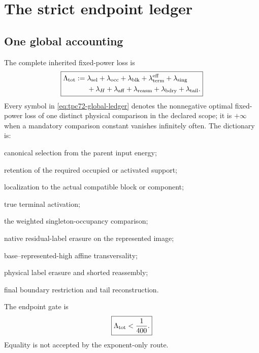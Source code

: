 \section{The strict endpoint ledger}
\label{sec:endpoint-ledger}

\subsection{One global accounting}

The complete inherited fixed-power loss is
\begin{equation}
 \boxed{
 \begin{aligned}
 \Lambda_{\rm tot}:={}&
 \lambda_{\rm sel}
 +\lambda_{\rm occ}
 +\lambda_{\rm blk}
 +\lambda_{\rm term}^{\rm eff}
 +\lambda_{\rm sing}\\
 &+\lambda_H+\lambda_{\rm aff}
 +\lambda_{\rm reasm}
 +\lambda_{\rm bdry}
 +\lambda_{\rm tail}.
 \end{aligned}}
 \label{eq:tpc72-global-ledger}
\end{equation}
Every symbol in \eqref{eq:tpc72-global-ledger} denotes the nonnegative
optimal fixed-power loss of one distinct physical comparison in the
declared scope; it is \(+\infty\) when a mandatory comparison constant
vanishes infinitely often.  The dictionary is:
\begin{description}[leftmargin=3.4em,style=nextline]
 \item[\(\lambda_{\rm sel}\)]
       canonical selection from the parent input energy;
 \item[\(\lambda_{\rm occ}\)]
       retention of the required occupied or activated support;
 \item[\(\lambda_{\rm blk}\)]
       localization to the actual compatible block or component;
 \item[\(\lambda_{\rm term}^{\rm eff}\)]
       true terminal activation;
 \item[\(\lambda_{\rm sing}\)]
       the weighted singleton-occupancy comparison;
 \item[\(\lambda_H\)]
       native residual-label erasure on the represented image;
 \item[\(\lambda_{\rm aff}\)]
       base--represented-high affine transversality;
 \item[\(\lambda_{\rm reasm}\)]
       physical label erasure and shorted reassembly;
 \item[\(\lambda_{\rm bdry},\lambda_{\rm tail}\)]
       final boundary restriction and tail reconstruction.
\end{description}
The endpoint gate is
\begin{equation}
 \boxed{\Lambda_{\rm tot}<\frac1{400}.}
 \label{eq:tpc72-strict-budget}
\end{equation}
Equality is not accepted by the exponent-only route.

